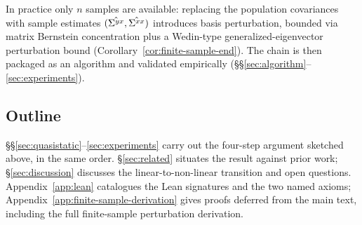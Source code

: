 In practice only $n$ samples are available: replacing the population covariances with
sample estimates $(\hat{\Sigma^{yx}},\hat{\Sigma^{xx}})$ introduces basis perturbation, bounded via
matrix Bernstein concentration plus a Wedin-type generalized-eigenvector perturbation
bound (Corollary~\ref{cor:finite-sample-end}). The chain is then packaged as an
algorithm and validated empirically (\S\S\ref{sec:algorithm}--\ref{sec:experiments}).

\subsection*{Outline}
\label{ssec:outline}

\S\S\ref{sec:quasistatic}--\ref{sec:experiments} carry out the
four-step argument sketched above, in the same order.
\S\ref{sec:related} situates the result against prior work;
\S\ref{sec:discussion} discusses the linear-to-non-linear transition
and open questions. Appendix~\ref{app:lean} catalogues the Lean
signatures and the two named axioms; Appendix~\ref{app:finite-sample-derivation}
gives proofs deferred from the main text, including the full
finite-sample perturbation derivation.
